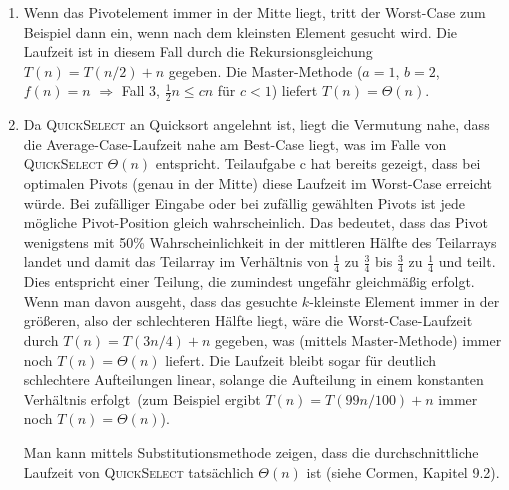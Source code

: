 \documentclass[11pt,a4paper]{article}
\begin{document}
\begin{loesung}
\begin{enumerate}
        \item
        Wenn das Pivotelement immer in der Mitte liegt, tritt der Worst-Case zum Beispiel dann ein, wenn nach dem kleinsten Element gesucht wird.
        Die Laufzeit ist in diesem Fall durch die Rekursionsgleichung $T(n) = T(n / 2) + n$ gegeben. Die Master-Methode ($a = 1$, $b = 2$, $f(n) = n$ $\Rightarrow$ Fall 3, $\frac{1}{2} n \leq cn$ für $c < 1$) liefert $T(n) = \Theta(n)$.

        \item Da \textsc{QuickSelect} an Quicksort angelehnt ist, liegt die Vermutung nahe, dass die Average-Case-Laufzeit nahe am Best-Case liegt, was im Falle von \textsc{QuickSelect} $\Theta(n)$ entspricht.
        Teilaufgabe c hat bereits gezeigt, dass bei optimalen Pivots (genau in der Mitte) diese Laufzeit im Worst-Case erreicht würde.
        Bei zufälliger Eingabe oder bei zufällig gewählten Pivots ist jede mögliche Pivot-Position gleich wahrscheinlich.
        Das bedeutet, dass das Pivot wenigstens mit 50\% Wahrscheinlichkeit in der mittleren Hälfte des Teilarrays landet und damit das Teilarray im Verhältnis von $\frac{1}{4}$ zu $\frac{3}{4}$ bis $\frac{3}{4}$ zu $\frac{1}{4}$ und teilt. 
        Dies entspricht einer Teilung, die zumindest ungefähr gleichmäßig erfolgt.
        Wenn man davon ausgeht, dass das gesuchte $k$-kleinste Element immer in der größeren, also der \glqq{}schlechteren\grqq{} Hälfte liegt, wäre die Worst-Case-Laufzeit durch $T(n) = T(3n / 4) + n$ gegeben, was (mittels Master-Methode) immer noch $T(n) = \Theta(n)$ liefert.
        Die Laufzeit bleibt sogar für deutlich schlechtere Aufteilungen linear, solange die Aufteilung in einem konstanten Verhältnis erfolgt~(zum Beispiel ergibt $T(n) = T(99n / 100) + n$ immer noch $T(n) = \Theta(n)$).

        Man kann mittels Substitutionsmethode zeigen, dass die durchschnittliche Laufzeit von \textsc{QuickSelect} tatsächlich $\Theta(n)$ ist (siehe Cormen, Kapitel 9.2).
    \end{enumerate}
\end{loesung}
\end{document}
